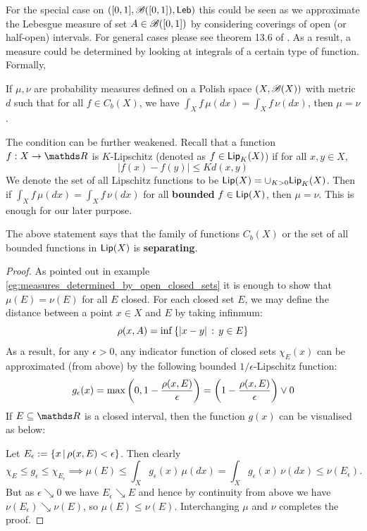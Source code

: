For the special case on $([0,1], \mathcal{B}([0,1]), \mathsf{Leb})$ this could be seen as we approximate the Lebesgue measure of set $A \in \mathcal{B}([0,1])$ by considering coverings of open (or half-open) intervals. For general cases please see theorem 13.6 of \cite{AchimProbability}. As a result, a measure could be determined by looking at integrals of a certain type of function. Formally,
\begin{lemma} \label{lem:uniqueness_by_integral}
If $\mu, \nu$ are probability measures defined on a Polish space $(X,\mathcal{B}(X))$ with metric $d$ such that for all $f \in C_b(X)$, we have $\int_X f \, \mu(dx) = \int_X f \, \nu(dx)$, then $\mu = \nu$.
\end{lemma}

\begin{remark} 
The condition can be further weakened. Recall that a function $f:X \to \R$ is $K$-Lipschitz (denoted as $f \in \mathsf{Lip}_K(X)$) if for all $x,y \in X$,
\begin{equation}
    |f(x) - f(y)| \leq K d(x,y)
\end{equation}
We denote the set of all Lipschitz functions to be $\mathsf{Lip}(X) = \cup_{K>0} \mathsf{Lip}_K(X)$. Then if $\int_X f \, \mu(dx) = \int_X f \, \nu(dx)$ for all \textbf{bounded} $f \in \mathsf{Lip}(X)$, then $\mu = \nu$. This is enough for our later purpose.
\end{remark}

The above statement says that the family of functions $C_b(X)$ or the set of all bounded functions in $\mathsf{Lip}(X)$ is \textbf{separating}.

\begin{proof}
As pointed out in example \ref{eg:measures_determined_by_open_closed_sets} it is enough to show that $\mu(E) = \nu(E)$ for all $E$ closed. For each closed set $E$, we may define the distance between a point $x \in X$ and $E$ by taking infinmum:
\begin{equation}
    \rho(x,A) = \inf\left\{ |x-y| \,:\, y \in E \right \}
\end{equation}
As a result, for any $\epsilon > 0$, any indicator function of closed sets $\chi_E(x)$ can be approximated (from above) by the following bounded $1/\epsilon$-Lipschitz function:
\begin{equation} \label{eq:Lipschitz_approx_indicator}
g_\epsilon(x) = \max\left( 0, 1-\frac{\rho(x,E)}{\epsilon} \right) = \left( 1-\frac{\rho(x,E)}{\epsilon} \right) \vee 0
\end{equation}
If $E \subseteq \R$ is a closed interval, then the function $g(x)$ can be visualised as below:
\begin{center}
    
\end{center}
Let $E_\epsilon := \left\{ x \,|\, \rho(x,E) < \epsilon \right \}$. Then clearly 
\begin{equation*}
    \chi_E \leq g_\epsilon \leq \chi_{E_\epsilon} \implies \mu(E) \leq \int_X g_\epsilon(x) \, \mu(dx) = \int_X g_\epsilon(x) \, \nu(dx) \leq \nu(E_\epsilon).
\end{equation*}
But as $\epsilon \searrow 0$ we have $E_\epsilon \searrow E$ and hence by continuity from above we have $\nu(E_\epsilon) \searrow \nu(E)$, so $\mu(E) \leq \nu(E)$. Interchanging $\mu$ and $\nu$ completes the proof.
\end{proof}

